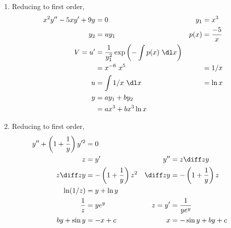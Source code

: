 \begin{enumerate}
    \item Reducing to first order,
          \begin{align}
              x^{2}y'' - 5xy' + 9y & = 0                                                        & y_{1} & = x^{3}        \\
              y_{2}                & = uy_{1}                                                   & p(x)  & = \frac{-5}{x} \\
              V = u'               & = \frac{1}{y_{1}^{2}} \exp\left( -\int p(x)\ \dl x \right)                          \\
                                   & = x^{-6}\ x^{5}                                            &       & = 1/x          \\
              u                    & = \int 1/x\ \dl x                                          &       & = \ln x        \\
              y                    & = ay_{1} + by_{2}                                                                   \\
                                   & = ax^{3} + bx^{3}\ln x
          \end{align}

    \item Reducing to first order,
          \begin{align}
              y'' + \left( 1 + \frac{1}{y} \right)y'^{2} & = 0                                                                                    \\
              z                                          & = y'                                   & y''      & = z \diff zy                       \\
              z\diff zy                                  & = -\left( 1 + \frac{1}{y} \right)z^{2} & \diff zy & = -\left( 1 + \frac{1}{y} \right)z \\
              \ln (1/z)                                  & = y + \ln y                                                                            \\
              \frac{1}{z}                                & = ye^{y}                               & z = y'   & = \frac{1}{ye^{y}}                 \\
              by + \sin y                                & = -x +c                                & x        & = -\sin y +by + c
          \end{align}


\end{enumerate}
